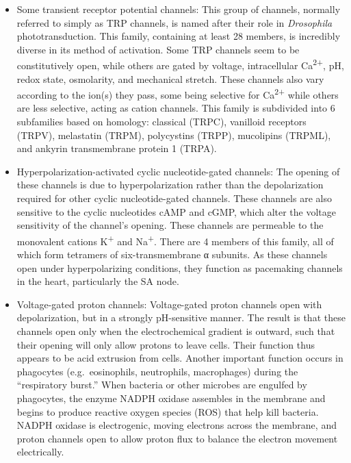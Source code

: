 \begin{itemize}
\item
  Some transient receptor potential channels: This group of channels, normally referred to simply as TRP channels, is named after their role in \emph{Drosophila} phototransduction. This family, containing at least 28 members, is incredibly diverse in its method of activation. Some TRP channels seem to be constitutively open, while others are gated by voltage, intracellular Ca\textsuperscript{2+}, pH, redox state, osmolarity, and mechanical stretch. These channels also vary according to the ion(s) they pass, some being selective for Ca\textsuperscript{2+} while others are less selective, acting as cation channels. This family is subdivided into 6 subfamilies based on homology: classical (TRPC), vanilloid receptors (TRPV), melastatin (TRPM), polycystins (TRPP), mucolipins (TRPML), and ankyrin transmembrane protein 1 (TRPA).
\item
  Hyperpolarization-activated cyclic nucleotide-gated channels: The opening of these channels is due to hyperpolarization rather than the depolarization required for other cyclic nucleotide-gated channels. These channels are also sensitive to the cyclic nucleotides cAMP and cGMP, which alter the voltage sensitivity of the channel's opening. These channels are permeable to the monovalent cations K\textsuperscript{+} and Na\textsuperscript{+}. There are 4 members of this family, all of which form tetramers of six-transmembrane α subunits. As these channels open under hyperpolarizing conditions, they function as pacemaking channels in the heart, particularly the SA node.
\item
  Voltage-gated proton channels: Voltage-gated proton channels open with depolarization, but in a strongly pH-sensitive manner. The result is that these channels open only when the electrochemical gradient is outward, such that their opening will only allow protons to leave cells. Their function thus appears to be acid extrusion from cells. Another important function occurs in phagocytes (e.g.~eosinophils, neutrophils, macrophages) during the ``respiratory burst.'' When bacteria or other microbes are engulfed by phagocytes, the enzyme NADPH oxidase assembles in the membrane and begins to produce reactive oxygen species (ROS) that help kill bacteria. NADPH oxidase is electrogenic, moving electrons across the membrane, and proton channels open to allow proton flux to balance the electron movement electrically.
\end{itemize}



